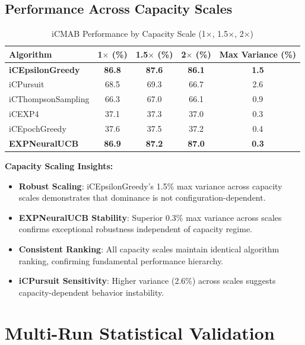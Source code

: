 \documentclass[12pt,a4paper]{article}
\newcommand{\primarytext}[1]{\textcolor{primaryblue}{\textbf{#1}}}
\newcommand{\secondarytext}[1]{\textcolor{secondaryblue}{\textbf{#1}}}
\newcommand{\warning}[1]{\textcolor{warningred}{\textbf{#1}}}
\newcommand{\legacy}[1]{\textcolor{legacycolor}{\textbf{#1}}}
\begin{document}
\subsection{Performance Across Capacity Scales}

\begin{table}[H]
\centering
\caption{iCMAB Performance by Capacity Scale (1$\times$, 1.5$\times$, 2$\times$)}
\label{tab:capacity-scale}
\begin{tabular}{@{}lcccc@{}}
\toprule
\textbf{Algorithm} & \textbf{1$\times$ (\%)} & \textbf{1.5$\times$ (\%)} & \textbf{2$\times$ (\%)} & \textbf{Max Variance (\%)} \\
\midrule
\primarytext{iCEpsilonGreedy}   & \primarytext{86.8} & \primarytext{87.6} & \primarytext{86.1} & \primarytext{1.5} \\
iCPursuit                       & 68.5 & 69.3 & 66.7 & 2.6 \\
iCThompsonSampling              & 66.3 & 67.0 & 66.1 & 0.9 \\
iCEXP4                          & 37.1 & 37.3 & 37.0 & 0.3 \\
iCEpochGreedy                   & 37.6 & 37.5 & 37.2 & 0.4 \\
\legacy{EXPNeuralUCB}           & \legacy{86.9} & \legacy{87.2} & \legacy{87.0} & \legacy{0.3} \\
\bottomrule
\end{tabular}
\end{table}

\textbf{Capacity Scaling Insights:}
\begin{itemize}
\item \primarytext{Robust Scaling}: iCEpsilonGreedy's 1.5\% max variance across capacity scales demonstrates that dominance is not configuration-dependent.
\item \legacy{EXPNeuralUCB Stability}: Superior 0.3\% max variance across scales confirms exceptional robustness independent of capacity regime.
\item \secondarytext{Consistent Ranking}: All capacity scales maintain identical algorithm ranking, confirming fundamental performance hierarchy.
\item \warning{iCPursuit Sensitivity}: Higher variance (2.6\%) across scales suggests capacity-dependent behavior instability.
\end{itemize}

\section{Multi-Run Statistical Validation}
\end{document}
